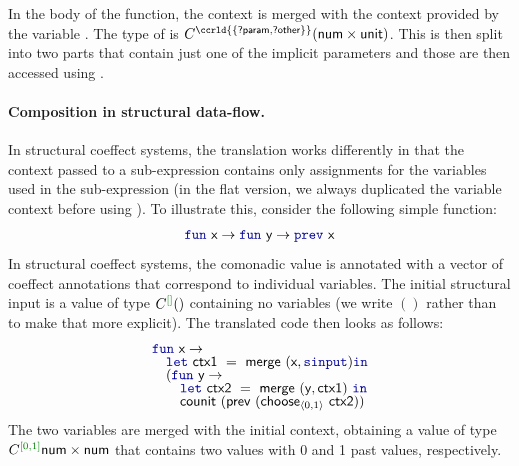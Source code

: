 In the body of the function, the context  is merged with the context provided by the
variable . The type of  is $\ctyp{\ccrld{\{\ident{?param},\ident{?other}\}}}{(\ident{num}\times\ident{unit})}$.
This is then split into two parts that contain just one of the implicit parameters and those are
then accessed using .

\paragraph{Composition in structural data-flow.}

In structural coeffect systems, the translation works differently in that the context passed to
a sub-expression contains only assignments for the variables used in the sub-expression (in the
flat version, we always duplicated the variable context before using ). To illustrate
this, consider the following simple function:
%
\begin{equation*}
\begin{array}{l}
\kvd{fun}~\ident{x} \rightarrow \kvd{fun}~\ident{y} \rightarrow \kvd{prev}~\ident{x}
\end{array}
\end{equation*}
%
In structural coeffect systems, the comonadic value is annotated with a vector of coeffect
annotations that correspond to individual variables. The initial structural input 
is a value of type $\ctyp{\cclrd{[]}}{()}$ containing no variables (we write $()$ rather than
 to make that more explicit). The translated code then looks as follows:
%
\begin{equation*}
\begin{array}{l}
\kvd{fun}~\ident{x} \rightarrow\\[-0.25em]
\quad \kvd{let}~\ident{ctx1} ~=~ \ident{merge}~(\ident{x}, \kvd{sinput}) \kvd{in}\\[-0.25em]
\quad (\kvd{fun}~\ident{y} \rightarrow\\[-0.25em]
\quad \quad \kvd{let}~\ident{ctx2} ~=~ \ident{merge}~(\ident{y}, \ident{ctx1})~\kvd{in}\\[-0.25em]
\quad \quad \ident{counit}~(\ident{prev}~(\ident{choose}_{\langle 0,1\rangle}~\ident{ctx2}))
\end{array}
\end{equation*}
%
The two variables are merged with the initial context, obtaining a value  of type
$\ctyp{\cclrd{[0, 1]}}{\ident{num}\times\ident{num}}$ that contains two values with 0 and 1 past
values, respectively.

